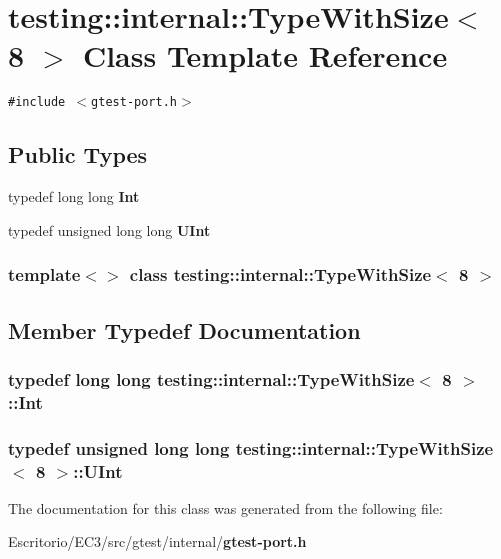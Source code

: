 \section{testing::internal::TypeWithSize$<$ 8 $>$ Class Template Reference}
\label{classtesting_1_1internal_1_1TypeWithSize_3_018_01_4}
{\tt \#include $<$gtest-port.h$>$}

\subsection*{Public Types}
\begin{CompactItemize}
\item 
typedef long long {\bf Int}
\item 
typedef unsigned long long {\bf UInt}
\end{CompactItemize}
\subsubsection*{template$<$$>$ class testing::internal::TypeWithSize$<$ 8 $>$}



\subsection{Member Typedef Documentation}
\subsubsection{\setlength{\rightskip}{0pt plus 5cm}typedef long long {\bf testing::internal::TypeWithSize}$<$ 8 $>$::{\bf Int}}\label{classtesting_1_1internal_1_1TypeWithSize_3_018_01_4_c4cda6f25d170a2a84c316231dec684b}


\subsubsection{\setlength{\rightskip}{0pt plus 5cm}typedef unsigned long long {\bf testing::internal::TypeWithSize}$<$ 8 $>$::{\bf UInt}}\label{classtesting_1_1internal_1_1TypeWithSize_3_018_01_4_df28c86deb4206268dc6bd0c516a0adb}




The documentation for this class was generated from the following file:\begin{CompactItemize}
\item 
Escritorio/EC3/src/gtest/internal/{\bf gtest-port.h}\end{CompactItemize}
